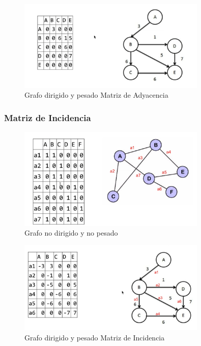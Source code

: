 \documentclass[../main.tex]{subfiles}
\begin{document}
            \begin{figure}[ht]
                \centering
                \includegraphics[width=0.8\textwidth]{images/grafos/grafo_matriz_adyacencia_2}
                \caption{Grafo dirigido y pesado Matriz de Adyacencia} 
            \end{figure}
            
            \newpage

        \subsubsection{Matriz de Incidencia}
            \begin{figure}[ht]
                \centering
                \includegraphics[width=0.8\textwidth]{images/grafos/grafo_matriz_incidencia_1.png}
                \caption{Grafo no dirigido y no pesado} 
            \end{figure}

            \begin{figure}[ht]
                \centering
                \includegraphics[width=0.8\textwidth]{images/grafos/grafo_matriz_incidencia_2.png}
                \caption{Grafo dirigido y pesado Matriz de Incidencia} 
            \end{figure}
\end{document}
